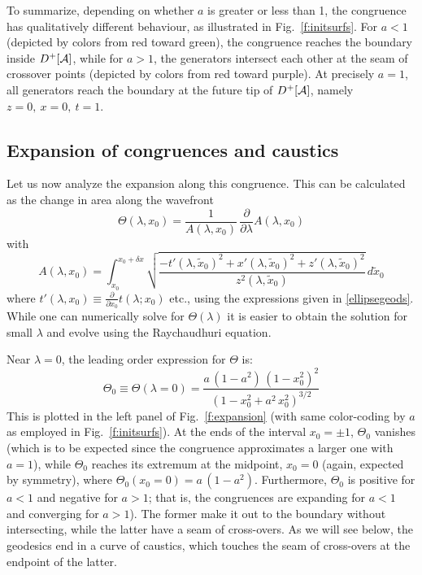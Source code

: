 \documentclass[12pt]{article}
\begin{document}
To summarize, depending on whether $a$ is greater or less than 1, the congruence has qualitatively different behaviour, as illustrated in Fig.~\ref{f:initsurfs}.  For $a<1$ (depicted by colors from red toward green), the congruence reaches the boundary inside $D^+[{\cal A}]$, while for $a>1$, the generators intersect each other at the seam of crossover points (depicted by colors from red toward purple).  At precisely $a=1$, all generators reach the boundary at the future tip of $D^+[{\cal A}]$, namely $z=0, \ x=0, \ t=1$.

\subsection{Expansion of congruences and caustics}

Let us now analyze the expansion along this congruence. This can be calculated as the change in area along the wavefront
%
\begin{equation}
\Theta(\lambda,x_0) = \frac{1}{A(\lambda,x_0)} \, \frac{\partial}{\partial \lambda}A(\lambda,x_0)
\label{ellipseThetadef}
\end{equation}	
%
with
%
\begin{equation}
A(\lambda,x_0) = \int_{x_0}^{x_0+\delta x}
\sqrt{\frac{-t'(\lambda ,{\tilde x}_0)^2+x'(\lambda ,{\tilde x}_0)^2+z'(\lambda ,{\tilde x}_0)^2}{z^2(\lambda ,{\tilde x}_0) }} \, d{\tilde x}_0
\label{}
\end{equation}	
%
where $t'(\lambda,x_0) \equiv \frac{\partial}{\partial x_0} t(\lambda;x_0)$ etc., using the expressions given in \eqref{ellipsegeods}. While one can numerically solve for $\Theta(\lambda)$ it is easier to obtain the solution for small $\lambda$ and evolve using the Raychaudhuri equation. 

Near $\lambda=0$, the leading order expression for $\Theta$ is: 
%
\begin{equation}
\Theta_0 \equiv \Theta(\lambda=0) = 
\frac{a \, (1-a^2) \, (1-x_0^2)^2}{(1-x_0^2+a^2 \, x_0^2)^{3/2}}
\label{initexp}
\end{equation}	
%
This is plotted in the left panel of Fig.~\ref{f:expansion} (with same color-coding by $a$ as employed in Fig.~\ref{f:initsurfs}). 
At the ends of the interval $x_0=\pm 1$, $\Theta_0$ vanishes (which is to be expected since the congruence approximates a larger one with $a=1$), while $\Theta_0$ reaches its extremum at the midpoint, $x_0=0$ (again, expected by symmetry), where  $\Theta_0(x_0=0) = a \, (1-a^2)$. Furthermore, $\Theta_0$ is positive for $a<1$ and negative for $a>1$; that is, the congruences are expanding for $a<1$ and converging for $a>1$). The former make it out to the boundary without intersecting, while the latter have a seam of cross-overs. As we will see below, the geodesics end in a curve of caustics, which touches the seam of cross-overs at the endpoint of the latter.
\end{document}
